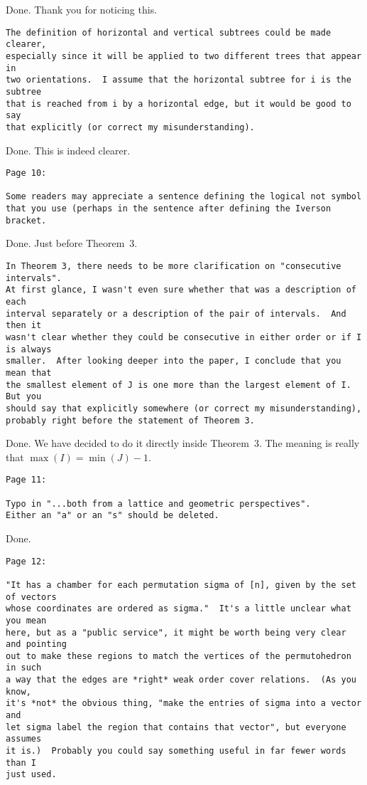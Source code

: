 \documentclass{article}
\begin{document}
Done. Thank you for noticing this.

\begin{verbatim}
The definition of horizontal and vertical subtrees could be made clearer, 
especially since it will be applied to two different trees that appear in 
two orientations.  I assume that the horizontal subtree for i is the subtree 
that is reached from i by a horizontal edge, but it would be good to say 
that explicitly (or correct my misunderstanding).
\end{verbatim}

Done. This is indeed clearer.

\begin{verbatim}
Page 10:

Some readers may appreciate a sentence defining the logical not symbol 
that you use (perhaps in the sentence after defining the Iverson bracket.
\end{verbatim}

Done. Just before Theorem~3.

\begin{verbatim}
In Theorem 3, there needs to be more clarification on "consecutive intervals".  
At first glance, I wasn't even sure whether that was a description of each 
interval separately or a description of the pair of intervals.  And then it 
wasn't clear whether they could be consecutive in either order or if I is always 
smaller.  After looking deeper into the paper, I conclude that you mean that 
the smallest element of J is one more than the largest element of I.  But you 
should say that explicitly somewhere (or correct my misunderstanding), 
probably right before the statement of Theorem 3.
\end{verbatim}

Done. We have decided to do it directly inside Theorem~3. The meaning is really that $\max(I) = \min(J)-1$.

\begin{verbatim}
Page 11:

Typo in "...both from a lattice and geometric perspectives".  
Either an "a" or an "s" should be deleted.
\end{verbatim}

Done.

\begin{verbatim}
Page 12:

"It has a chamber for each permutation sigma of [n], given by the set of vectors 
whose coordinates are ordered as sigma."  It's a little unclear what you mean 
here, but as a "public service", it might be worth being very clear and pointing 
out to make these regions to match the vertices of the permutohedron in such 
a way that the edges are *right* weak order cover relations.  (As you know, 
it's *not* the obvious thing, "make the entries of sigma into a vector and 
let sigma label the region that contains that vector", but everyone assumes 
it is.)  Probably you could say something useful in far fewer words than I 
just used.
\end{verbatim}
\end{document}
